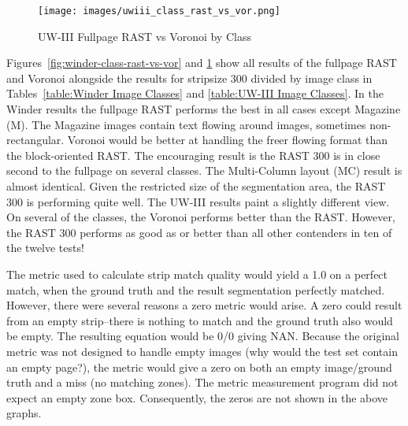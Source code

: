 \documentclass[conference]{IEEEtran}
\begin{document}
\begin{figure}[uwiii-class-rast-vs-vor]
\caption{UW-III Fullpage RAST vs Voronoi by Class}
\begin{center}
\texttt{[image: images/uwiii\_class\_rast\_vs\_vor.png]}
\label{fig:uwiii-class-rast-vs-vor}
\end{center}
\end{figure}


Figures~\ref{fig:winder-class-rast-vs-vor} and \ref{fig:uwiii-class-rast-vs-vor} show all results of 
the fullpage RAST and Voronoi alongside the results
for stripsize 300 divided by image class in Tables~\ref{table:Winder Image Classes} 
and \ref{table:UW-III Image Classes}. In the Winder results the fullpage RAST performs the best in
all cases except Magazine (M). 
The Magazine images
contain text flowing around images, sometimes non-rectangular. Voronoi would be
better at handling the freer flowing format than the block-oriented RAST.
The encouraging result is the RAST 300 is in
close second to the fullpage on several classes. The Multi-Column layout (MC)
result is almost identical. Given the restricted size of the segmentation area,
the RAST 300 is performing quite well. The UW-III results paint a slightly
different view. On several of the classes, the Voronoi performs better than the
RAST. However, the RAST 300 performs as good as or better than all other
contenders in ten of the twelve tests!

The metric used to calculate strip match quality would yield a 1.0 on a perfect
match, when the ground truth and the result segmentation perfectly matched. However, there
were several reasons a zero metric would arise. A zero could result from an
empty strip--there is nothing to match and the ground truth also would be
empty. The resulting equation would be 0/0 giving NAN. Because the original
metric was not designed to handle empty images (why would the test set contain
an empty page?), the metric would give a zero on both an empty image/ground
truth and a miss (no matching zones). The metric measurement program did not
expect an empty zone box. Consequently, the zeros are not shown in the above
graphs.
\end{document}
